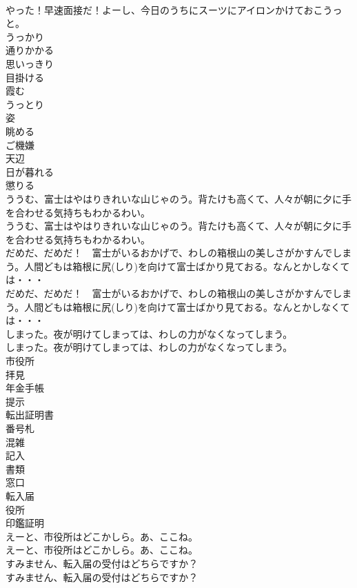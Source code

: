 \documentclass[8pt]{extreport}
\begin{document}
\begin{CJK}{UTF8}{min}
\\	やった！早速面接だ！よーし、今日のうちにスーツにアイロンかけておこうっと。 
\\	うっかり
\\	通りかかる
\\	思いっきり
\\	目掛ける
\\	霞む
\\	うっとり
\\	姿
\\	眺める
\\	ご機嫌
\\	天辺
\\	日が暮れる
\\	懲りる
\\	ううむ、富士はやはりきれいな山じゃのう。背たけも高くて、人々が朝に夕に手を合わせる気持ちもわかるわい。	
\\	ううむ、富士はやはりきれいな山じゃのう。背たけも高くて、人々が朝に夕に手を合わせる気持ちもわかるわい。　 
\\	だめだ、だめだ！　富士がいるおかげで、わしの箱根山の美しさがかすんでしまう。人間どもは箱根に尻(しり)を向けて富士ばかり見ておる。なんとかしなくては・・・	
\\	だめだ、だめだ！　富士がいるおかげで、わしの箱根山の美しさがかすんでしまう。人間どもは箱根に尻(しり)を向けて富士ばかり見ておる。なんとかしなくては・・・ 
\\	しまった。夜が明けてしまっては、わしの力がなくなってしまう。	
\\	しまった。夜が明けてしまっては、わしの力がなくなってしまう。 
\\	市役所
\\	拝見
\\	年金手帳
\\	提示
\\	転出証明書
\\	番号札
\\	混雑
\\	記入
\\	書類
\\	窓口
\\	転入届
\\	役所
\\	印鑑証明
\\	えーと、市役所はどこかしら。あ、ここね。	
\\	えーと、市役所はどこかしら。あ、ここね。 
\\	すみません、転入届の受付はどちらですか？	
\\	すみません、転入届の受付はどちらですか？ 

\end{CJK}
\end{document}
